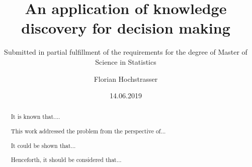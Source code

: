 \begin{titlepage}

\titlehead{Master Thesis}
\subject{Profit maximization for direct marketing campaigns}
\title{An application of knowledge discovery for decision making}
\subtitle{Submitted in partial fulfillment of the requirements for the degree of Master of Science in Statistics}
\author{Florian Hochstrasser}
\date{14.06.2019}
\publishers{Supervisor: Jacques Zuber}

\end{titlepage}

\let\maketitle\oldmaketitle
\maketitle

\begin{abstract}

It is known that....

This work addressed the problem from the perspective of...

It could be shown that...

Henceforth, it should be considered that...
\end{abstract}
